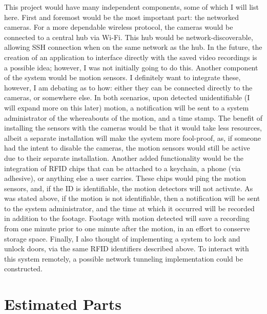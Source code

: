 \documentclass[conference]{IEEEtran}
\begin{document}
This project would have many independent components, some of which I will list here. First and foremost would be the most important part: the networked cameras. For a more dependable wireless protocol, the cameras would be connected to a central hub via Wi-Fi. This hub would be network-discoverable, allowing SSH connection when on the same network as the hub. In the future, the creation of an application to interface directly with the saved video recordings is a possible idea; however, I was not initially going to do this. Another component of the system would be motion sensors. I definitely want to integrate these, however, I am debating as to how: either they can be connected directly to the cameras, or somewhere else. In both scenarios, upon detected unidentifiable (I will expand more on this later) motion, a notification will be sent to a system administrator of the whereabouts of the motion, and a time stamp. The benefit of installing the sensors with the cameras would be that it would take less resources, albeit a separate installation will make the system more fool-proof, as, if someone had the intent to disable the cameras, the motion sensors would still be active due to their separate installation. Another added functionality would be the integration of RFID chips that can be attached to a keychain, a phone (via adhesive), or anything else a user carries. These chips would ping the motion sensors, and, if the ID is identifiable, the motion detectors will not activate. As was stated above, if the motion is not identifiable, then a notification will be sent to the system administrator, and the time at which it occurred will be recorded in addition to the footage. Footage with motion detected will save a recording from one minute prior to one minute after the motion, in an effort to conserve storage space. Finally, I also thought of implementing a system to lock and unlock doors, via the same RFID identifiers described above. To interact with this system remotely, a possible network tunneling implementation could be constructed.

\section{Estimated Parts}

\vspace{15pt}
\end{document}
